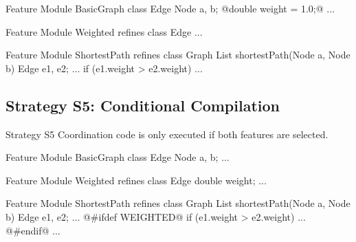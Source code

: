 \begin{frame}[fragile]{\myframetitle}
	\begin{mycolumns}[animation=none]
\begin{codetight}{Feature Module BasicGraph}
class Edge {
	Node a, b;
	@double weight = 1.0;@
	...
}
\end{codetight}	
\begin{codetight}{Feature Module Weighted}
refines class Edge {
	...
}
\end{codetight}	
	\mynextcolumn
\begin{codetight}{Feature Module ShortestPath}
refines class Graph {
	List shortestPath(Node a, Node b){
		Edge e1, e2;
		...
		if (e1.weight > e2.weight) 
		... 
	}
}
\end{codetight}	
	\end{mycolumns}
\end{frame}

\subsection{Strategy S5: Conditional Compilation}

\begin{frame}{\myframetitle}
	\begin{mycolumns}[widths={30},animation=none]
		\begin{definition}{Strategy S5}
			Coordination code is only executed if both features are selected.
		\end{definition}
	\mynextcolumn
	\end{mycolumns}
\end{frame}

\begin{frame}[fragile]{\myframetitle}
	\begin{mycolumns}[animation=none]
\begin{codetight}{Feature Module BasicGraph}
class Edge {
	Node a, b; ...
}
\end{codetight}	
\begin{codetight}{Feature Module Weighted}
refines class Edge {
	double weight; ...
}
\end{codetight}	
	\mynextcolumn
\begin{codetight}{Feature Module ShortestPath}
refines class Graph {
	List shortestPath(Node a, Node b){
		Edge e1, e2;
		...
@#ifdef WEIGHTED@		
		if (e1.weight > e2.weight) ...
@#endif@
		... 
	}
}
\end{codetight}	
	\end{mycolumns}
\end{frame}

